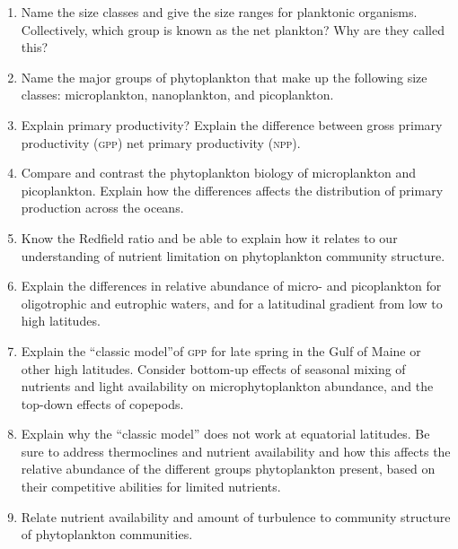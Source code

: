 \documentclass[letterpaper]{tufte-handout}
\begin{document}
\begin{enumerate}

	\item Name the size classes and give the size ranges for planktonic organisms. Collectively, which group is known as the net plankton? Why are they called this?
	
	\item Name the major groups of phytoplankton that make up the following size classes: microplankton, nanoplankton, and picoplankton.
	
	\item Explain primary productivity? Explain the difference between gross primary productivity (\textsc{gpp}) net primary productivity (\textsc{npp}).
	
	\item Compare and contrast the phytoplankton biology of microplankton and picoplankton. Explain how the differences affects the distribution of primary production across the oceans.
	
	\item Know the Redfield ratio  and be able to explain how it relates to our understanding of nutrient limitation on phytoplankton community structure.
	
	\item Explain the differences in relative abundance of micro- and picoplankton for oligotrophic and eutrophic waters, and for a latitudinal gradient from low to high latitudes.

	\item Explain the ``classic model''of \textsc{gpp} for late spring in the Gulf of Maine or other high latitudes. Consider bottom-up effects of seasonal mixing of nutrients and light availability on microphytoplankton abundance, and the top-down effects of copepods.
	
	\item Explain why the ``classic model'' does not work at equatorial latitudes. Be sure to address thermoclines and nutrient availability and how this affects the relative abundance of the different groups phytoplankton present, based on their competitive abilities for limited nutrients.
	
	\item Relate nutrient availability and amount of turbulence to community structure of phytoplankton communities.
	

\end{enumerate}
\end{document}
